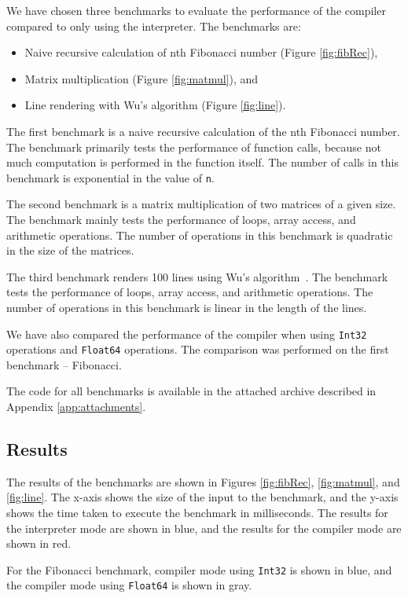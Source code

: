 We have chosen three benchmarks to evaluate the performance of the compiler compared to only using the interpreter. The benchmarks are:
\begin{itemize}
    \item Naive recursive calculation of nth Fibonacci number (Figure \ref{fig:fibRec}),
    \item Matrix multiplication (Figure \ref{fig:matmul}), and
    \item Line rendering with Wu's algorithm (Figure \ref{fig:line}).
\end{itemize}

The first benchmark is a naive recursive calculation of the nth Fibonacci number. The benchmark primarily tests the performance of function calls, because not much computation is performed in the function itself. The number of calls in this benchmark is exponential in the value of \texttt{n}.

The second benchmark is a matrix multiplication of two matrices of a given size. The benchmark mainly tests the performance of loops, array access, and arithmetic operations. The number of operations in this benchmark is quadratic in the size of the matrices.

The third benchmark renders 100 lines using Wu's algorithm~\cite{wu}. The benchmark tests the performance of loops, array access, and arithmetic operations. The number of operations in this benchmark is linear in the length of the lines.

We have also compared the performance of the compiler when using \texttt{Int32} operations and \texttt{Float64} operations. The comparison was performed on the first benchmark -- Fibonacci.

The code for all benchmarks is available in the attached archive described in Appendix \ref{app:attachments}.


\subsection{Results}

The results of the benchmarks are shown in Figures \ref{fig:fibRec}, \ref{fig:matmul}, and \ref{fig:line}. The x-axis shows the size of the input to the benchmark, and the y-axis shows the time taken to execute the benchmark in milliseconds. The results for the interpreter mode are shown in blue, and the results for the compiler mode are shown in red.

For the Fibonacci benchmark, compiler mode using \texttt{Int32} is shown in blue, and the compiler mode using \texttt{Float64} is shown in gray.

